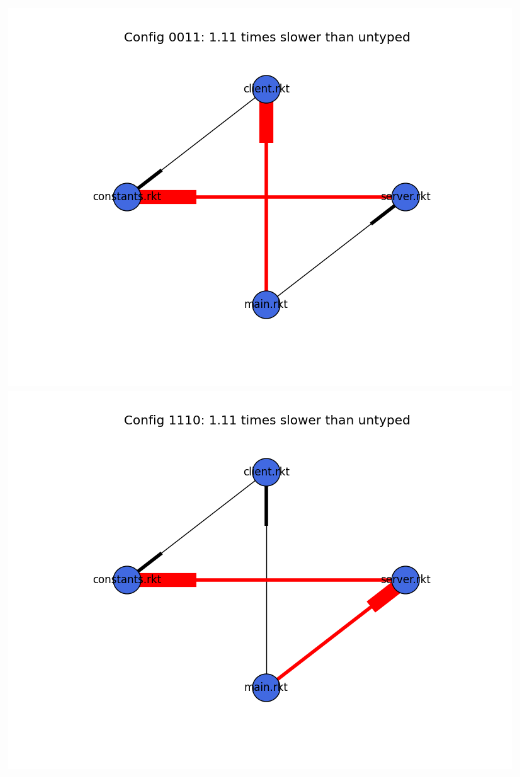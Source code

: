 \documentclass{article}
\begin{document}
\begin{itemize}
\includegraphics[width=\textwidth]{echo-module-graph-0011.png}
\includegraphics[width=\textwidth]{echo-module-graph-1110.png}
\end{itemize}
\end{document}
